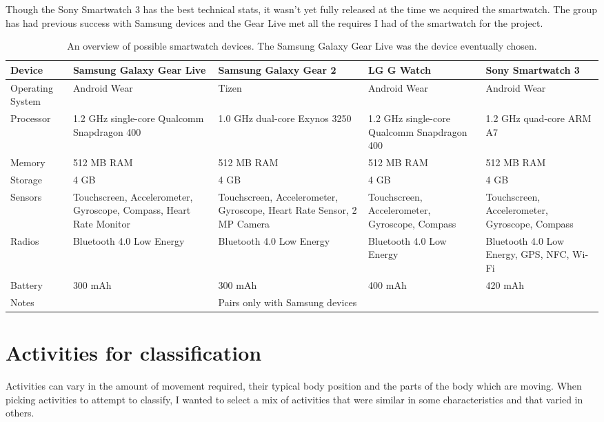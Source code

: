       Though the Sony Smartwatch 3 has the best technical stats, it wasn't yet fully released at the time we acquired the smartwatch. The group has had previous success with Samsung devices and the Gear Live met all the requires I had of the smartwatch for the project.
      \begin{table}
        \centering
        {\tabulinesep=1.2mm
        \begin{tabu} to 
          Device & \textbf{Samsung Galaxy Gear Live} & \textbf{Samsung Galaxy Gear 2} &\textbf{ LG G Watch} & \textbf{Sony Smartwatch 3} \\
          \hline
          Operating System & Android Wear & Tizen & Android Wear & Android Wear \\
          \hline
          Processor & 1.2 GHz single-core Qualcomm Snapdragon 400 & 1.0 GHz dual-core Exynos 3250 & 1.2 GHz single-core Qualcomm Snapdragon 400 & 1.2 GHz quad-core ARM A7 \\
          \hline
          Memory & 512 MB RAM & 512 MB RAM & 512 MB RAM & 512 MB RAM \\
          \hline
          Storage & 4 GB & 4 GB & 4 GB & 4 GB \\
          \hline
          Sensors & Touchscreen, Accelerometer, Gyroscope, Compass, Heart Rate Monitor & Touchscreen, Accelerometer, Gyroscope, Heart Rate Sensor, 2 MP Camera & Touchscreen, Accelerometer, Gyroscope, Compass & Touchscreen, Accelerometer, Gyroscope, Compass \\
          \hline
          Radios & Bluetooth 4.0 Low Energy & Bluetooth 4.0 Low Energy & Bluetooth 4.0 Low Energy & Bluetooth 4.0 Low Energy, GPS, NFC, Wi-Fi \\
          \hline
          Battery & 300 mAh & 300 mAh & 400 mAh & 420 mAh \\
          \hline
          Notes &  & Pairs only with Samsung devices &  & \\
          \hline
          
        \end{tabu}}
        \caption[An overview of possible smartwatch devices]{An overview of possible smartwatch devices. The Samsung Galaxy Gear Live was the device eventually chosen.}
        \label{tab:smartwatch-features}
      \end{table}

  \section{Activities for classification}
    \label{sec:activities_for_classification}
    Activities can vary in the amount of movement required, their typical body position and the parts of the body which are moving. When picking activities to attempt to classify, I wanted to select a mix of activities that were similar in some characteristics and that varied in others.
    
